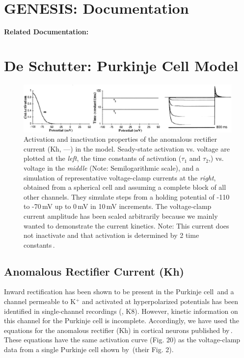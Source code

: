 \documentclass[12pt]{article}
\begin{document}
\section*{GENESIS: Documentation}

{\bf Related Documentation:}

\section*{De Schutter: Purkinje Cell Model}

\begin{figure}[h]
\centering
   \includegraphics[scale=0.75]{figures/DS1.2D.eps}
   \caption{Activation and inactivation properties of the anomalous rectifier current (Kh, ---) in the model. Seady-state activation vs. voltage are plotted at the {\em left}, the time constants of activation ($\tau_1$ and $\tau_2$,) vs. voltage in the {\em middle} (Note: Semilogarithmic scale), and a simulation of representative voltage-clamp currents at the {\em right}, obtained from a spherical cell and assuming a complete block of all other channels. They simulate steps from a holding potential of -110 to -70\,mV up to 0\,mV in 10\,mV increments. The voltage-clamp current amplitude has been scaled arbitrarily because we mainly wanted to demonstrate the current kinetics. Note: This current does not inactivate and that activation is determined by 2 time constants\,\cite{Spain-W-J:1987ij}.}
   \label{fig:DS1.2D}
\end{figure}

\subsection*{Anomalous Rectifier Current (Kh)}

Inward rectification has been shown to be present in the Purkinje cell\,\cite{Crepel:1986cr, Hounsgaard:1988nx} and a channel permeable to K$^+$ and activated at hyperpolarized potentials has been identified in single-channel recordings (\cite{Gruol:1989oq}, K8). However, kinetic information on this channel for the Purkinje cell is incomplete. Accordingly, we have used the equations for the anomalous rectifier (Kh) in cortical neurons published by\,\cite{Spain-W-J:1987ij}. These equations have the same activation curve (Fig. 20) as the voltage-clamp data from a single Purkinje cell shown by\,\cite{Crepel:1986cr} (their Fig. 2).



\end{document}

